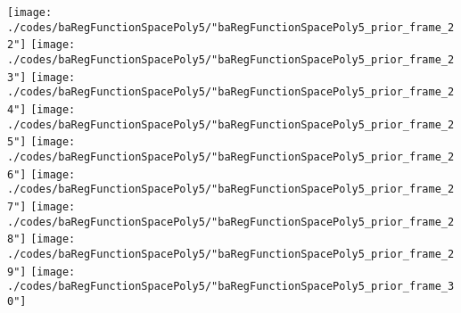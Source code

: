 \begin{frame}{\insertsection}
\begin{center}
{\begin{animateinline}{20}
				 \texttt{[image: ./codes/baRegFunctionSpacePoly5/"baRegFunctionSpacePoly5\_prior\_frame\_22"]}\newframe
				 \texttt{[image: ./codes/baRegFunctionSpacePoly5/"baRegFunctionSpacePoly5\_prior\_frame\_23"]}\newframe
				 \texttt{[image: ./codes/baRegFunctionSpacePoly5/"baRegFunctionSpacePoly5\_prior\_frame\_24"]}\newframe
				 \texttt{[image: ./codes/baRegFunctionSpacePoly5/"baRegFunctionSpacePoly5\_prior\_frame\_25"]}\newframe
				 \texttt{[image: ./codes/baRegFunctionSpacePoly5/"baRegFunctionSpacePoly5\_prior\_frame\_26"]}\newframe
				 \texttt{[image: ./codes/baRegFunctionSpacePoly5/"baRegFunctionSpacePoly5\_prior\_frame\_27"]}\newframe
				 \texttt{[image: ./codes/baRegFunctionSpacePoly5/"baRegFunctionSpacePoly5\_prior\_frame\_28"]}\newframe
				 \texttt{[image: ./codes/baRegFunctionSpacePoly5/"baRegFunctionSpacePoly5\_prior\_frame\_29"]}\newframe
				 \texttt{[image: ./codes/baRegFunctionSpacePoly5/"baRegFunctionSpacePoly5\_prior\_frame\_30"]}
			 \end{animateinline}
			}
	\end{center}
    
\end{frame}

